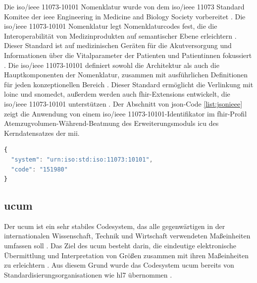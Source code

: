 Die \acs{iso}/\ac{ieee} 11073-10101\texttrademark{} Nomenklatur wurde von dem \acs{iso}/\ac{ieee} 11073\texttrademark{} Standard Komitee der \glqq \ac{ieee} Engineering in Medicine and Biology Society\grqq{} vorbereitet \cite{ieeeiso}. Die \acs{iso}/\ac{ieee} 11073-10101\texttrademark{} Nomenklatur legt Nomenklaturcodes fest, die die Interoperabilität von Medizinprodukten auf semantischer Ebene erleichtern \cite{ieeearch}. Dieser Standard ist auf medizinischen Geräten für die Akutversorgung und Informationen über die Vitalparameter der Patienten und Patientinnen fokussiert \cite{ieeeiso}. Die \acs{iso}/\ac{ieee} 11073-10101\texttrademark{} definiert sowohl die Architektur als auch die Hauptkomponenten der Nomenklatur, zusammen mit ausführlichen Definitionen für jeden konzeptionellen Bereich \cite{ieeesa}. Dieser Standard ermöglicht die Verlinkung mit \ac{loinc} und \ac{snomedct}, außerdem werden auch \ac{fhir}-Extensions entwickelt, die \acs{iso}/\ac{ieee} 11073-10101\texttrademark{} unterstützen \cite{ieeeextending}. Der Abschnitt von \ac{json}-Code \ref{list:jsonieee} zeigt die Anwendung von einem \acs{iso}/\ac{ieee} 11073-10101\texttrademark{}-Identifikator im \ac{fhir}-Profil \glqq Atemzugvolumen-Während-Beatmung\grqq{} des Erweiterungsmoduls \glqq\ac{icu}\grqq{} des Kerndatensatzes der \ac{mii}.

\begin{lstlisting}[caption={[\acs{iso}/\acs{ieee} 11073-10101\texttrademark{} in \acs{fhir}] Beispiel der Anwendung von \acs{iso}/\acs{ieee} 11073-10101\texttrademark{} in \acs{fhir}.},language=JavaScript, label=list:jsonieee, captionpos=b]
{
  "system": "urn:iso:std:iso:11073:10101",
  "code": "151980"
}
\end{lstlisting}

\subsection{\acs{ucum}} \label{sub:ucum}

Der \ac{ucum} ist ein sehr stabiles Codesystem, das alle gegenwärtigen in der internationalen Wissenschaft, Technik und Wirtschaft verwendeten Maßeinheiten umfassen soll \cite{ucumwebnih}. Das Ziel des \ac{ucum} besteht darin, die eindeutige elektronische Übermittlung und Interpretation von Größen zusammen mit ihren Maßeinheiten zu erleichtern \cite{ucumwebnih, ucumweb}. Aus diesem Grund wurde das Codesystem \ac{ucum} bereits von Standardisierungsorganisationen wie \ac{hl7} übernommen \cite{ucumweb}.